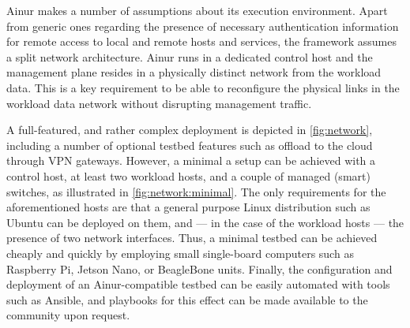 Ainur makes a number of assumptions about its execution environment.
Apart from generic ones regarding the presence of necessary authentication information for remote access to local and remote hosts and services, the framework assumes a split network architecture.
Ainur runs in a dedicated control host and the management plane resides in a physically distinct network from the workload data.
This is a key requirement to be able to reconfigure the physical links in the workload data network without disrupting management traffic.

A full-featured, and rather complex deployment is depicted in \cref{fig:network}, including a number of optional testbed features such as offload to the cloud through \gls{VPN} gateways.
However, a minimal a setup can be achieved with a control host, at least two workload hosts, and a couple of managed (smart) switches, as illustrated in \cref{fig:network:minimal}.
The only requirements for the aforementioned hosts are that a general purpose Linux distribution such as Ubuntu can be deployed on them, and --- in the case of the workload hosts --- the presence of two network interfaces.
Thus, a minimal testbed can be achieved cheaply and quickly by employing small single-board computers such as Raspberry Pi, Jetson Nano, or BeagleBone units.
Finally, the configuration and deployment of an Ainur-compatible testbed can be easily automated with tools such as Ansible, and playbooks for this effect can be made available to the community upon request.


